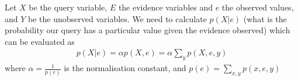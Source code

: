 \documentclass[a4paper]{article}
\theoremstyle{plain}
\theoremstyle{definition}
\newtheorem{defn}{Definition}[section]
\theoremstyle{remark}
\begin{document}
\begin{tcolorbox}[colback=black!3!white,colframe=black!60!white,title=\begin{defn}Generalised Inference Procedure \label{Generalised Inference Procedure}\end{defn}]
Let $X$ be the query variable, $E$ the evidence variables and $e$ the observed values, and $Y$ be the unobserved variables. We need to calculate $p(X|e)$ (what is the probability our query has a particular value given the evidence observed) which can be evaluated as
\begin{align}
	p(X|e) = \alpha p(X,e) = \alpha \sum_{y}^{} p(X,e,y)
\end{align}
where $\alpha=\frac{1}{p(e)}$ is the normalisation constant,  and $p(e) = \sum_{x,y}^{} p(x,e,y)$
\end{tcolorbox}
\end{document}
